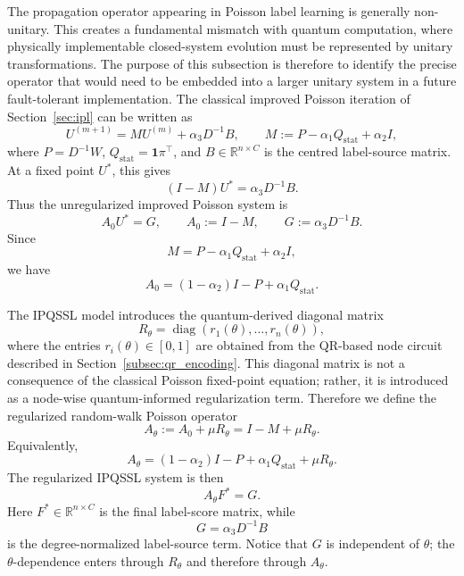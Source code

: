 \documentclass[11pt,a4paper]{article}
\begin{document}
The propagation operator appearing in Poisson label learning is generally
non-unitary. This creates a fundamental mismatch with quantum computation,
where physically implementable closed-system evolution must be represented
by unitary transformations. The purpose of this subsection is therefore to
identify the precise operator that would need to be embedded into a larger
unitary system in a future fault-tolerant implementation.
The classical improved Poisson iteration of Section~\ref{sec:ipl} can be written as
\[
U^{(m+1)} = M U^{(m)}+\alpha_3D^{-1}B,
\qquad
M:=P-\alpha_1Q_{\mathrm{stat}}+\alpha_2I,
\]
where \(P=D^{-1}W\), \(Q_{\mathrm{stat}}=\mathbf 1\pi^\top\), and
\(B\in\mathbb{R}^{n\times C}\) is the centred label-source matrix. At a fixed
point \(U^\ast\), this gives
\[
(I-M)U^\ast=\alpha_3D^{-1}B.
\]
Thus the unregularized improved Poisson system is
\[
A_0U^\ast=G,
\qquad
A_0:=I-M,
\qquad
G:=\alpha_3D^{-1}B.
\]
Since
\[
M=P-\alpha_1Q_{\mathrm{stat}}+\alpha_2I,
\]
we have
\[
A_0
=
(1-\alpha_2)I-P+\alpha_1Q_{\mathrm{stat}}.
\]

The IPQSSL model introduces the quantum-derived diagonal matrix
\[
R_\theta=\operatorname{diag}(r_1(\theta),\ldots,r_n(\theta)),
\]
where the entries \(r_i(\theta)\in[0,1]\) are obtained from the QR-based
node circuit described in Section~\ref{subsec:qr_encoding}. This diagonal matrix is not a
consequence of the classical Poisson fixed-point equation; rather, it is
introduced as a node-wise quantum-informed regularization term. Therefore
we define the regularized random-walk Poisson operator
\[
A_\theta:=A_0+\mu R_\theta
=
I-M+\mu R_\theta.
\]
Equivalently,
\[
A_\theta
=
(1-\alpha_2)I-P+\alpha_1Q_{\mathrm{stat}}+\mu R_\theta.
\]
The regularized IPQSSL system is then
\[
A_\theta F^\ast=G.
\]
Here \(F^\ast\in\mathbb{R}^{n\times C}\) is the final label-score matrix,
while
\[
G=\alpha_3D^{-1}B
\]
is the degree-normalized label-source term. Notice that \(G\) is independent
of \(\theta\); the \(\theta\)-dependence enters through \(R_\theta\) and
therefore through \(A_\theta\).
\end{document}
